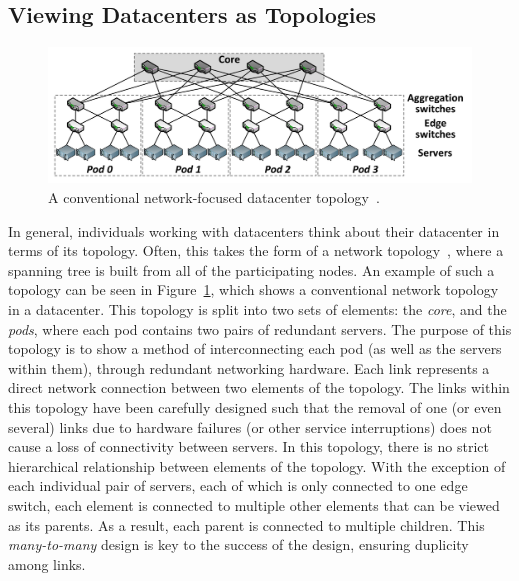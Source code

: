 \documentclass[11pt]{article}
\begin{document}
	\subsection{Viewing Datacenters as Topologies}
		\begin{figure}[]
			\centering
			\includegraphics[width=\textwidth]{couto2012/Fat-tree-with-4-port-switches-n-4.png}
			\caption[A conventional network-focused datacenter topology]{A conventional network-focused datacenter topology~\cite{Couto2012}.}
			\label{fig:networktopology}
		\end{figure}
		In general, individuals working with datacenters think about their datacenter in terms of its topology. 
		Often, this takes the form of a network topology~\cite{Couto2012}, where a spanning tree is built from all of the participating nodes.
		An example of such a topology can be seen in Figure~\ref{fig:networktopology}, which shows a conventional network topology in a datacenter.
		This topology is split into two sets of elements: the \textit{core}, and the \textit{pods}, where each pod contains two pairs of redundant servers.
		The purpose of this topology is to show a method of interconnecting each pod (as well as the servers within them), through redundant networking hardware.
		Each link represents a direct network connection between two elements of the topology.
		The links within this topology have been carefully designed such that the removal of one (or even several) links due to hardware failures (or other service interruptions) does not cause a loss of connectivity between servers.
		In this topology, there is no strict hierarchical relationship between elements of the topology.
		With the exception of each individual pair of servers, each of which is only connected to one edge switch, each element is connected to multiple other elements that can be viewed as its parents. As a result, each parent is connected to multiple children. This \textit{many-to-many} design is key to the success of the design, ensuring duplicity among links.
\end{document}
